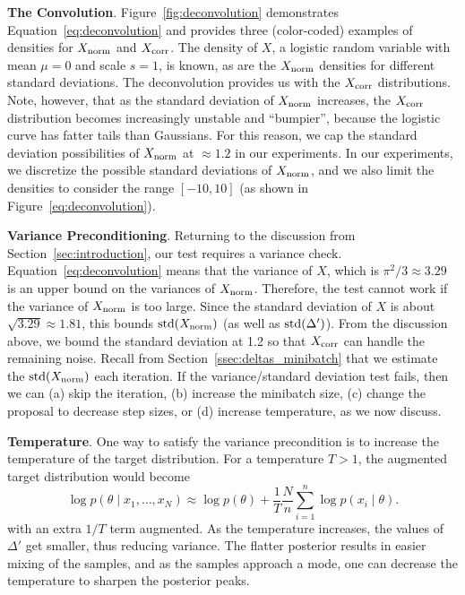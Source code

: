 \documentclass{article}
\begin{document}
\textbf{The Convolution}. Figure~\ref{fig:deconvolution} demonstrates
Equation~\ref{eq:deconvolution} and provides three (color-coded) examples of densities for $X_{\rm
norm}$ and $X_{\rm corr}$. The density of $X$, a logistic random variable with mean $\mu = 0$ and
scale $s=1$, is known, as are the $X_{\rm norm}$ densities for different standard deviations. The
deconvolution provides us with the $X_{\rm corr}$ distributions. Note, however, that as the standard
deviation of $X_{\rm norm}$ increases, the $X_{\rm corr}$ distribution becomes increasingly unstable
and ``bumpier'', because the logistic curve has fatter tails than Gaussians. For this reason, we cap
the standard deviation possibilities of $X_{\rm norm}$ at $\approx 1.2$ in our experiments. In our
experiments, we discretize the possible standard deviations of $X_{\rm norm}$, and we also limit the
densities to consider the range $[-10,10]$ (as shown in Figure~\ref{eq:deconvolution}).

\textbf{Variance Preconditioning}. Returning to the discussion from Section~\ref{sec:introduction},
our test requires a variance check. Equation~\ref{eq:deconvolution} means that the variance of $X$,
which is $\pi^2/3\approx 3.29$ is an upper bound on the variances of $X_{\rm norm}$. Therefore, the
test cannot work if the variance of $X_{\rm norm}$ is too large. Since the standard deviation of $X$
is about $\sqrt{3.29}\approx 1.81$, this bounds ${\rm std}(X_{\rm norm})$ (as well as ${\rm
std}(\Delta')$). From the discussion above, we bound the standard deviation at 1.2 so that $X_{\rm
corr}$ can handle the remaining noise. Recall from Section~\ref{ssec:deltas_minibatch} that we
estimate the ${\rm std}(X_{\rm norm})$ each iteration. If the variance/standard deviation test
fails, then we can (a) skip the iteration, (b) increase the minibatch size, (c) change the proposal
to decrease step sizes, or (d) increase temperature, as we now discuss.

\textbf{Temperature}. One way to satisfy the variance precondition is to increase the temperature of
the target distribution. For a temperature $T>1$, the augmented target distribution would become
\begin{equation}\label{eq:log_temperature}
\log p(\theta \mid x_1,\ldots,x_N) \approx \log p(\theta) + \frac{1}{T}\frac{N}{n} \sum_{i=1}^n\log p(x_i \mid \theta).
\end{equation}
with an extra $1/T$ term augmented. As the temperature increases, the values of $\Delta'$ get
smaller, thus reducing variance. The flatter posterior results in easier mixing of the samples, and
as the samples approach a mode, one can decrease the temperature to sharpen the posterior peaks.
\end{document}
